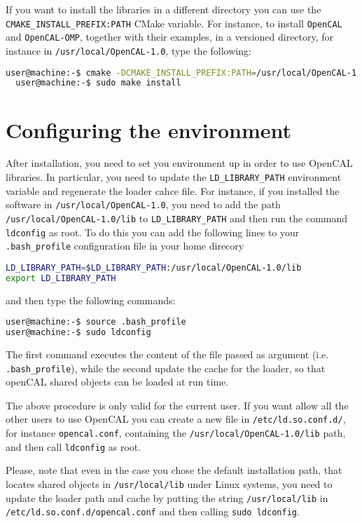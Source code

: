 If you want to install the libraries in a different directory you can
use the \texttt{CMAKE\_INSTALL\_PREFIX:PATH} CMake variable. For
instance, to install \verb'OpenCAL' and \verb'OpenCAL-OMP', together
with their examples, in a versioned directory, for instance in
\texttt{/usr/local/OpenCAL-1.0}, type the following:

\begin{lstlisting}[numbers=none,language=bash,label={ch:quickstart:sudoinstall}]
  user@machine:-$ cmake -DCMAKE_INSTALL_PREFIX:PATH=/usr/local/OpenCAL-1.0 -DBUILD_EXAMPLES=ON -DBUILD_OPENCAL_OMP=ON ../
  user@machine:-$ sudo make install
\end{lstlisting}


\section{Configuring the environment}
After installation, you need to set you environment up in order to use
OpenCAL libraries. In particular, you need to update the
\verb'LD_LIBRARY_PATH' environment variable and regenerate the loader
cahce file. For instance, if you installed the software in
\verb'/usr/local/OpenCAL-1.0', you need to add the path
\verb'/usr/local/OpenCAL-1.0/lib' to \verb'LD_LIBRARY_PATH' and then
run the command \verb'ldconfig' as root. To do this you can add the
following lines to your \verb'.bash_profile' configuration file in
your home direcory
\begin{lstlisting}[numbers=none,language=bash,label={ch:quickstart:.bash_profile}]
LD_LIBRARY_PATH=$LD_LIBRARY_PATH:/usr/local/OpenCAL-1.0/lib
export LD_LIBRARY_PATH
\end{lstlisting}
and then type the following commands:
\begin{lstlisting}[numbers=none,language=bash,label={ch:quickstart:source}]
user@machine:-$ source .bash_profile
user@machine:-$ sudo ldconfig
\end{lstlisting}
The first command executes the content of the file passed as argument
(i.e. \verb'.bash_profile'), while the second update the cache for the
loader, so that openCAL shared objects can be loaded at run time.

The above procedure is only valid for the current user. If you want
allow all the other users to use OpenCAL you can create a new file in
\verb'/etc/ld.so.conf.d/', for instance \verb'opencal.conf',
containing the \verb'/usr/local/OpenCAL-1.0/lib' path, and then call
\verb'ldconfig' as root.

Please, note that even in the case you chose the default installation
path, that locates shared objects in \verb'/usr/local/lib' under Linux
systems, you need to update the loader path and cache by putting the
string \verb'/usr/local/lib' in \verb'/etc/ld.so.conf.d/opencal.conf'
and then calling \verb'sudo ldconfig'.


